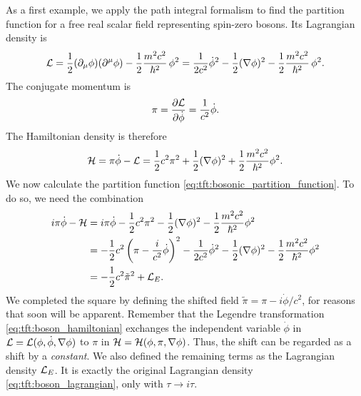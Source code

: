 As a first example, we apply the path integral formalism to find the partition function for a free real scalar field representing spin-zero bosons.
Its Lagrangian density is
\begin{equation}
	\mathcal{L} = \frac{1}{2} (\partial_\mu \phi) (\partial^\mu \phi) - \frac12 \frac{m^2 c^2}{\hbar^2} \, \phi^2
	      = \frac{1}{2 c^2} \dot{\phi}^2 - \frac12 (\nabla \phi)^2  - \frac12 \frac{m^2 c^2}{\hbar^2} \, \phi^2 .
\label{eq:tft:boson_lagrangian}
\end{equation}
The conjugate momentum  is
\begin{equation}
	\pi = \pdv{\mathcal{L}}{\dot{\phi}} = \frac{1}{c^2} \dot{\phi} .
\end{equation}
The Hamiltonian density is therefore
\begin{equation}
	\mathcal{H} = \pi \dot{\phi} - \mathcal{L} = \frac12 c^2 \pi^2 + \frac12 (\nabla \phi)^2 + \frac12 \frac{m^2 c^2}{\hbar^2} \phi^2 .
\label{eq:tft:boson_hamiltonian}
\end{equation}
We now calculate the partition function \eqref{eq:tft:bosonic_partition_function}.
To do so, we need the combination
\begin{equation}
\begin{split}
	i \pi \dot\phi - \mathcal{H} &= i \pi \dot\phi - \frac{1}{2} c^2 \pi^2 - \frac12 (\nabla \phi)^2 - \frac{1}{2} \frac{m^2 c^2}{\hbar^2} \phi^2 \\
	                      &= -\frac{1}{2} c^2 \left( \pi - \frac{i}{c^2} \dot\phi \right)^2 - \frac{1}{2 c^2} \dot\phi^2 - \frac{1}{2} (\nabla \phi)^2 - \frac{1}{2} \frac{m^2 c^2}{\hbar^2} \phi^2 \\
	                      &= -\frac{1}{2} c^2 \tilde\pi^2 + \mathcal{L}_E . \\
\end{split}
\label{eq:tft:boson_field_combination}
\end{equation}
We completed the square by defining the shifted field $\tilde\pi = \pi - i \dot\phi / c^2$, for reasons that soon will be apparent.
Remember that the Legendre transformation \eqref{eq:tft:boson_hamiltonian} exchanges the independent variable $\dot\phi$ in $\mathcal{L} = \mathcal{L}(\phi, \dot\phi, \nabla\phi)$ to $\pi$ in $\mathcal{H} = \mathcal{H}(\phi, \pi, \nabla\phi)$.
Thus, the shift can be regarded as a shift by a \emph{constant}.
We also defined the remaining terms as the Lagrangian density $\mathcal{L}_E$.
It is exactly the original Lagrangian density \eqref{eq:tft:boson_lagrangian}, only with $\tau \rightarrow i \tau$.

